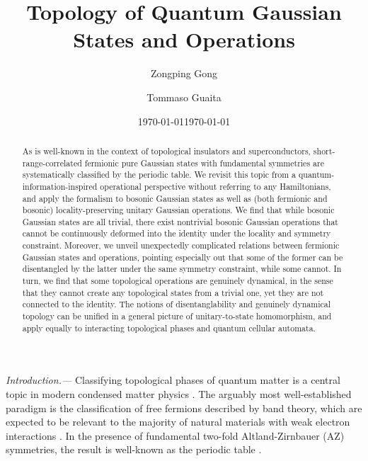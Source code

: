 \documentclass[prl,twocolumn,preprintnumbers,superscriptaddress,amsmath,amssymb]{revtex4-1}
\begin{document}
\title{Topology of Quantum Gaussian States and Operations}
\author{Zongping Gong}
\date{\today}
\author{Tommaso Guaita}
\date{\today}


\begin{abstract}
As is well-known in the context of topological insulators and superconductors, short-range-correlated fermionic pure Gaussian states with fundamental symmetries are systematically classified by the periodic table. We revisit this topic from a quantum-information-inspired operational perspective without referring to any Hamiltonians, and apply the formalism to bosonic Gaussian states as well as (both fermionic and bosonic) locality-preserving unitary Gaussian operations. We find that while bosonic Gaussian states are all trivial, there exist nontrivial bosonic Gaussian operations that cannot be continuously deformed into the identity under the locality and symmetry constraint. Moreover, we unveil unexpectedly complicated relations between fermionic Gaussian states and operations, pointing especially out that some of the former can be disentangled by the latter under the same symmetry constraint, while some cannot. In turn, we find that some topological operations are genuinely dynamical, in the sense that they cannot create any topological states from a trivial one, yet they are not connected to the identity. The notions of disentanglability and genuinely dynamical topology can be unified in a general picture of unitary-to-state homomorphism, and apply equally to interacting topological phases and quantum cellular automata.
\end{abstract}
\maketitle

\emph{Introduction.---} Classifying topological phases of quantum matter is a central topic in modern condensed matter physics \cite{Ryu2016}. The arguably most well-established paradigm is the classification of free fermions described by band theory, which are expected to be relevant to the majority of natural materials with weak electron interactions \cite{Kane2010,Qi2011}. In the presence of fundamental two-fold Altland-Zirnbauer (AZ) \cite{Altland1997} symmetries, the result is well-known as the periodic table \cite{Ryu2008,Ryu2010,Kitaev2009,Teo2010}.
\end{document}
